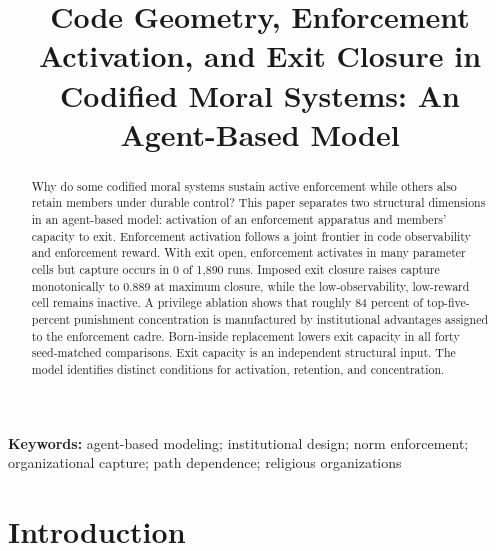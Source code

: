 \documentclass[12pt]{article}
\title{Code Geometry, Enforcement Activation, and Exit Closure in Codified Moral Systems: An Agent-Based Model}
\author{}
\date{}
\date{}
\newcommand{\affiliation}{}
\begin{document}
\maketitle
\vspace{1em}


\begin{abstract}
Why do some codified moral systems sustain active enforcement while others also retain members under durable control? This paper separates two structural dimensions in an agent-based model: activation of an enforcement apparatus and members' capacity to exit. Enforcement activation follows a joint frontier in code observability and enforcement reward. With exit open, enforcement activates in many parameter cells but capture occurs in 0 of 1,890 runs. Imposed exit closure raises capture monotonically to 0.889 at maximum closure, while the low-observability, low-reward cell remains inactive. A privilege ablation shows that roughly 84 percent of top-five-percent punishment concentration is manufactured by institutional advantages assigned to the enforcement cadre. Born-inside replacement lowers exit capacity in all forty seed-matched comparisons. Exit capacity is an independent structural input. The model identifies distinct conditions for activation, retention, and concentration.
\end{abstract}
\vspace{1em}\noindent\textbf{Keywords:} agent-based modeling; institutional design; norm enforcement; organizational capture; path dependence; religious organizations

\newpage


\section{Introduction}
\end{document}
